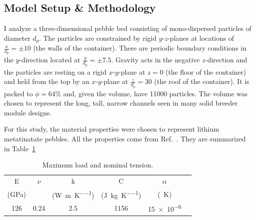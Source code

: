 \subsection{Model Setup \& Methodology}\label{sec:dem-setup}
I analyze a three-dimensional pebble bed consisting of mono-dispersed particles of diameter $d_p$. The particles are constrained by rigid $y$-$z$-planes at locations of $\frac{x}{d_p} = \pm 10$ (the walls of the container). There are periodic boundary conditions in the $y$-direction located at $\frac{y}{d_p} = \pm 7.5$. Gravity acts in the negative $z$-direction and the particles are resting on a rigid $x$-$y$-plane at $z=0$ (the floor of the container) and held from the top by an $x$-$y$-plane at $\frac{z}{d_p} = 30$ (the roof of the container). It is packed to $\phi = 64\%$ and, given the volume, have 11000 particles. The volume was chosen to represent the long, tall, narrow channels seen in many solid breeder module designs\cite{ Cho2008, Poitevin2010, Enoeda2003}.

For this study, the material properties were chosen to represent lithium metatinatate pebbles. All the properties come from Ref.~\cite{Gierszewski1998}. They are summarized in Table~\ref{tab:mat-props}

\begin {table}[tp] %
\caption{Maximum load and nominal tension.}
\label {tab:mat-props} \centering %
\begin {tabular}{ cccccc }
\toprule %
E           &     $\nu$    	&    k         	&    C          &   $\alpha$                \\
(\si{\giga\pascal})    	&            	& (\si{\watt\per\meter\per\kelvin}) 		&  (\si{\joule\per\kilogram\per\kelvin})  	&   (\si{\per\kelvin})                   \\\toprule
\num{126}			&      \num{0.24}     &  \num{2.5}          &  \num{1156}       	&   \num{15e-6}		\\\bottomrule
\end{tabular}
\end{table}


